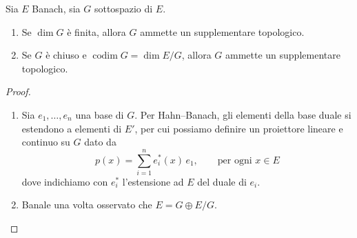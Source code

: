 \begin{theorem}
	Sia $E$ Banach, sia $G$ sottospazio di $E$.
	\begin{enumerate}
		\item Se $\dim G$ è finita, allora $G$ ammette un supplementare topologico.
		\item Se $G$ è chiuso e $\operatorname{codim} G = \dim E/G$, allora $G$ ammette un supplementare topologico.
	\end{enumerate}
\end{theorem}
\begin{proof}
	\leavevmode
	\begin{enumerate}
		\item Sia $e_1, \ldots, e_n$ una base di $G$. Per Hahn--Banach, gli elementi della base duale si estendono a elementi di $E'$, per cui possiamo definire un proiettore lineare e continuo su $G$ dato da
		\begin{equation*}
			p(x) = \sum_{i=1}^n e^*_i(x)\,e_1, \qquad \text{per ogni $x \in E$}
		\end{equation*}
		dove indichiamo con $e^*_i$ l'estensione ad $E$ del duale di $e_i$.
		\item Banale una volta osservato che $E = G \oplus E/G$.
	\end{enumerate}
\end{proof}
